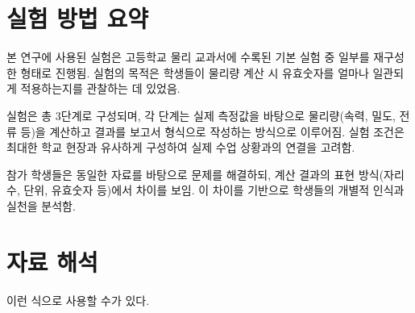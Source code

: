 
\chapter{실험 방법 요약}

본 연구에 사용된 실험은 고등학교 물리 교과서에 수록된 기본 실험 중 일부를 재구성한 형태로 진행됨. 실험의 목적은 학생들이 물리량 계산 시 유효숫자를 얼마나 일관되게 적용하는지를 관찰하는 데 있었음.

실험은 총 3단계로 구성되며, 각 단계는 실제 측정값을 바탕으로 물리량(속력, 밀도, 전류 등)을 계산하고 결과를 보고서 형식으로 작성하는 방식으로 이루어짐. 실험 조건은 최대한 학교 현장과 유사하게 구성하여 실제 수업 상황과의 연결을 고려함.

참가 학생들은 동일한 자료를 바탕으로 문제를 해결하되, 계산 결과의 표현 방식(자리수, 단위, 유효숫자 등)에서 차이를 보임. 이 차이를 기반으로 학생들의 개별적 인식과 실천을 분석함.

\chapter{자료 해석}
이런 식으로 사용할 수가 있다.